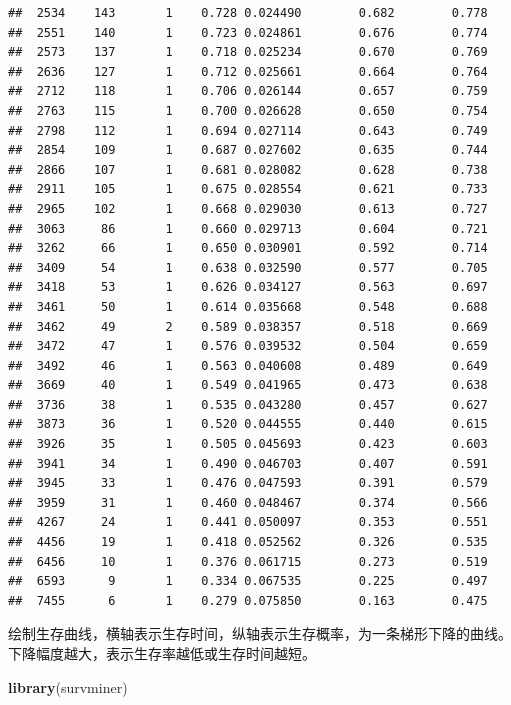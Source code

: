 \documentclass[]{article}
\newenvironment{Shaded}{\begin{snugshade}}{\end{snugshade}}
\newcommand{\KeywordTok}[1]{\textcolor[rgb]{0.13,0.29,0.53}{\textbf{{#1}}}}
\newcommand{\NormalTok}[1]{{#1}}
\numberwithin{figure}{section}
\numberwithin{table}{section}
\theoremstyle{definition}
\theoremstyle{definition}
\theoremstyle{definition}
\theoremstyle{remark}
\begin{document}
\begin{verbatim}
##  2534    143       1    0.728 0.024490        0.682        0.778
##  2551    140       1    0.723 0.024861        0.676        0.774
##  2573    137       1    0.718 0.025234        0.670        0.769
##  2636    127       1    0.712 0.025661        0.664        0.764
##  2712    118       1    0.706 0.026144        0.657        0.759
##  2763    115       1    0.700 0.026628        0.650        0.754
##  2798    112       1    0.694 0.027114        0.643        0.749
##  2854    109       1    0.687 0.027602        0.635        0.744
##  2866    107       1    0.681 0.028082        0.628        0.738
##  2911    105       1    0.675 0.028554        0.621        0.733
##  2965    102       1    0.668 0.029030        0.613        0.727
##  3063     86       1    0.660 0.029713        0.604        0.721
##  3262     66       1    0.650 0.030901        0.592        0.714
##  3409     54       1    0.638 0.032590        0.577        0.705
##  3418     53       1    0.626 0.034127        0.563        0.697
##  3461     50       1    0.614 0.035668        0.548        0.688
##  3462     49       2    0.589 0.038357        0.518        0.669
##  3472     47       1    0.576 0.039532        0.504        0.659
##  3492     46       1    0.563 0.040608        0.489        0.649
##  3669     40       1    0.549 0.041965        0.473        0.638
##  3736     38       1    0.535 0.043280        0.457        0.627
##  3873     36       1    0.520 0.044555        0.440        0.615
##  3926     35       1    0.505 0.045693        0.423        0.603
##  3941     34       1    0.490 0.046703        0.407        0.591
##  3945     33       1    0.476 0.047593        0.391        0.579
##  3959     31       1    0.460 0.048467        0.374        0.566
##  4267     24       1    0.441 0.050097        0.353        0.551
##  4456     19       1    0.418 0.052562        0.326        0.535
##  6456     10       1    0.376 0.061715        0.273        0.519
##  6593      9       1    0.334 0.067535        0.225        0.497
##  7455      6       1    0.279 0.075850        0.163        0.475
\end{verbatim}

绘制生存曲线，横轴表示生存时间，纵轴表示生存概率，为一条梯形下降的曲线。下降幅度越大，表示生存率越低或生存时间越短。

\begin{Shaded}
\begin{Highlighting}[]
\KeywordTok{library}\NormalTok{(survminer)}
\end{Highlighting}
\end{Shaded}
\end{document}
